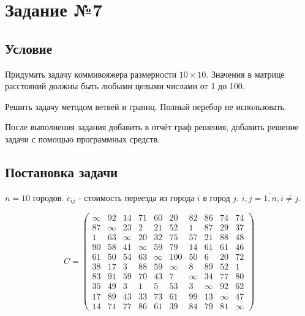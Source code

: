 \section{Задание №7}\label{07-lab}

\subsection{Условие}\label{07-lab-condition}

Придумать задачу коммивояжера размерности $10 \times 10$. Значения в матрице расстояний должны быть любыми целыми числами от 1 до 100.

Решить задачу методом ветвей и границ. Полный перебор не использовать.

После выполнения задания добавить в отчёт граф решения, добавить решение задачи с помощью программных средств.

\subsection{Постановка задачи}\label{07-lab-statement}

$n = 10$ городов. $c_{ij}$ - стоимость переезда из города $i$ в город $j$. $i, j = \overline{1, n}, i \neq j$.


\[
    C = \begin{pmatrix}
        \infty & 92     & 14     & 71     & 60     & 20     & 82     & 86     & 74     & 74     \\
        87     & \infty & 23     & 2      & 21     & 52     & 1      & 87     & 29     & 37     \\
        1      & 63     & \infty & 20     & 32     & 75     & 57     & 21     & 88     & 48     \\
        90     & 58     & 41     & \infty & 59     & 79     & 14     & 61     & 61     & 46     \\
        61     & 50     & 54     & 63     & \infty & 100    & 50     & 6      & 20     & 72     \\
        38     & 17     & 3      & 88     & 59     & \infty & 8      & 89     & 52     & 1      \\
        83     & 91     & 59     & 70     & 43     & 7      & \infty & 34     & 77     & 80     \\
        35     & 49     & 3      & 1      & 5      & 53     & 3      & \infty & 92     & 62     \\
        17     & 89     & 43     & 33     & 73     & 61     & 99     & 13     & \infty & 47     \\
        14     & 71     & 77     & 86     & 61     & 39     & 84     & 79     & 81     & \infty
    \end{pmatrix}
\]

